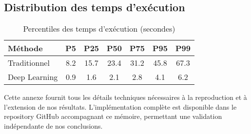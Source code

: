 \subsection{Distribution des temps d'exécution}

\begin{table}[H]
\centering
\caption{Percentiles des temps d'exécution (secondes)}
\begin{tabular}{@{}lcccccc@{}}
\toprule
\textbf{Méthode} & \textbf{P5} & \textbf{P25} & \textbf{P50} & \textbf{P75} & \textbf{P95} & \textbf{P99} \\
\midrule
Traditionnel & 8.2 & 15.7 & 23.4 & 31.2 & 45.8 & 67.3 \\
Deep Learning & 0.9 & 1.6 & 2.1 & 2.8 & 4.1 & 6.2 \\
\bottomrule
\end{tabular}
\end{table}

Cette annexe fournit tous les détails techniques nécessaires à la reproduction et à l'extension de nos résultats. L'implémentation complète est disponible dans le repository GitHub accompagnant ce mémoire, permettant une validation indépendante de nos conclusions.
